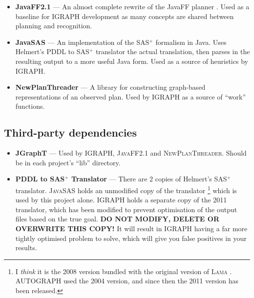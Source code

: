 \documentclass[10pt,a4paper]{article}
\begin{document}
\begin{itemize}
\item \textbf{JavaFF2.1} --- An almost complete rewrite of the JavaFF planner \cite{Coles08}. Used as a baseline for IGRAPH development as many concepts are shared between planning and recognition.
\item \textbf{JavaSAS} --- An implementation of the SAS$^+$ formalism in Java. Uses Helmert's PDDL to SAS$^+$ translator \cite{Helmert04} the actual translation, then parses in the resulting output to a more useful Java form. Used as a source of heuristics by \textsc{IGRAPH}.
\item \textbf{NewPlanThreader} --- A library for constructing graph-based representations of an observed plan. Used by \textsc{IGRAPH} as a source of ``work'' functions.
\end{itemize}

\subsection{Third-party dependencies}
\begin{itemize}
\item \textbf{JGraphT} --- Used by \textsc{IGRAPH}, \textsc{JavaFF2.1} and \textsc{NewPlanThreader}. Should be in each project's ``lib'' directory.
\item \textbf{PDDL to SAS$^+$ Translator} --- There are 2 copies of Helmert's SAS$^+$ translator. \textsc{JavaSAS} holds an unmodified copy of the translator \footnote{I \emph{think} it is the 2008 version bundled with the original version of \textsc{Lama} \cite{Richter08}. \textsc{AUTOGRAPH} used the 2004 version, and since then the 2011 version has been released.} which is used by this project alone. \textsc{IGRAPH} holds a separate copy of the 2011 translator, which has been modified to prevent optimisation of the output files based on the true goal. \textbf{DO NOT MODIFY, DELETE OR OVERWRITE THIS COPY!} It will result in \textsc{IGRAPH} having a far more tightly optimised problem to solve, which will give 
you false positives in your results.

\end{itemize}
\end{document}
